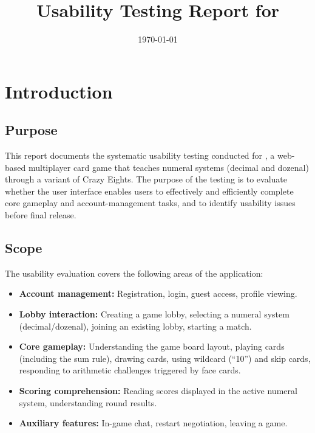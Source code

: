 \documentclass[12pt, titlepage]{article}
\begin{document}
\title{Usability Testing Report for \progname{}}
\author{\authname}
\date{\today}

\maketitle


\tableofcontents

\newpage



\section{Introduction}\label{sec:intro}

\subsection{Purpose}

This report documents the systematic usability testing conducted for \progname{},
a web-based multiplayer card game that teaches numeral systems (decimal and dozenal)
through a variant of Crazy Eights. The purpose of the testing is to evaluate
whether the user interface enables users to effectively and efficiently
complete core gameplay and account-management tasks, and to identify
usability issues before final release.

\subsection{Scope}

The usability evaluation covers the following areas of the application:
\begin{itemize}
  \item \textbf{Account management:} Registration, login, guest access, profile viewing.
  \item \textbf{Lobby interaction:} Creating a game lobby, selecting a numeral system (decimal/dozenal), joining an existing lobby, starting a match.
  \item \textbf{Core gameplay:} Understanding the game board layout, playing cards (including the sum rule), drawing cards, using wildcard (``10'') and skip cards, responding to arithmetic challenges triggered by face cards.
  \item \textbf{Scoring comprehension:} Reading scores displayed in the active numeral system, understanding round results.
  \item \textbf{Auxiliary features:} In-game chat, restart negotiation, leaving a game.
\end{itemize}
\end{document}
